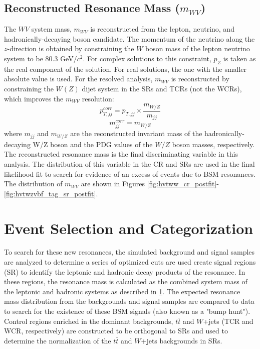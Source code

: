 \section{Reconstructed Resonance Mass ($m_{WV}$)}
\label{mwv}
The $WV$ system mass, $m_{WV}$ is reconstructed from the lepton, neutrino, and hadronically-decaying boson candidate. The momentum of the neutrino along the $z$-direction is obtained by constraining the $W$ boson mass of the lepton neutrino system to be  80.3 GeV$/c^{2}$. For complex solutions to this constraint, $p_{Z}$ is taken as the real component of the solution. For real solutions, the one with the smaller absolute value is used. For the resolved analysis, $m_{WV}$ is reconstructed by constraining the $W(Z)$ dijet system in the SRs and TCRs (not the WCRs), which improves the $m_{WV}$ resolution:
\begin{equation}
p^{corr}_{T,jj} = p_{T,jj} \times \frac{m_{W/Z}}{m_{jj}}
\end{equation}
\begin{equation}
m^{corr}_{jj}=m_{W/Z}
\end{equation}
where $m_{jj}$ and $m_{W/Z}$ are the reconstructed invariant mass of the hadronically-decaying W/Z boson and the PDG values of the $W/Z$ boson masses, respectively. The reconstructed resonance mass is the final discriminating variable in this analysis. The distribution of this variable in the CR and SRs are used in the final likelihood fit to search for evidence of an excess of events due to BSM resonances. The distribution of $m_{WV}$ are shown in Figures \ref{fig:hvtww_cr_postfit}-\ref{fig:hvtwzvbf_tag_sr_postfit}. 
\chapter{Event Selection and Categorization}
To search for these new resonances, the simulated background and signal samples are analyzed to determine a series of optimized cuts are used create signal regions (SR) to identify the leptonic and hadronic decay products of the resonance. In these regions, the resonance mass is calculated as the combined system mass of the leptonic and hadronic systems as described in \ref{mwv}. The expected resonance mass distribution from the backgrounds and signal samples are compared to data to search for the existence of these BSM signals (also known as a "bump hunt"). Control regions enriched in the dominant backgrounds, $t\bar{t}$ and $W$+jets (TCR and WCR, respectively) are constructed to be orthogonal to SRs and used to determine the normalization of the $t\bar{t}$ and $W$+jets backgrounds in SRs.


